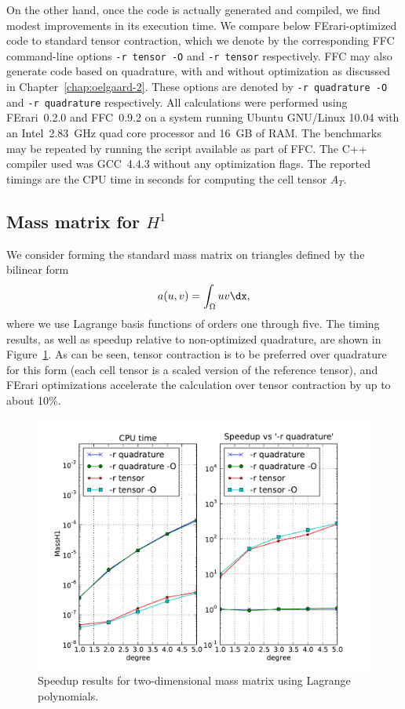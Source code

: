 On the other hand, once the code is actually generated and compiled,
we find modest improvements in its execution time. We compare below
FErari-optimized code to standard tensor contraction, which we denote
by the corresponding FFC command-line options \texttt{-r tensor -O}
and \texttt{-r tensor} respectively. FFC may also generate code based
on quadrature, with and without optimization as discussed in
Chapter~\ref{chap:oelgaard-2}. These options are denoted by \texttt{-r
  quadrature -O} and \texttt{-r quadrature} respectively. All
calculations were performed using FErari~0.2.0 and FFC~0.9.2 on a
system running Ubuntu GNU/Linux 10.04 with an Intel~2.83~GHz quad core
processor and 16~GB of RAM. The benchmarks may be repeated by running
the script  available as part of FFC. The C++
compiler used was GCC~4.4.3 without any optimization flags. The
reported timings are the CPU time in seconds for computing the cell
tensor $A_T$.

\subsection{Mass matrix for $H^1$}

We consider forming the standard mass matrix on triangles defined by
the bilinear form
\begin{equation} \label{eq:MassH1}
  a(u, v) = \int_{\Omega} u v \dx,
\end{equation}
where we use Lagrange basis functions of orders one through five. The
timing results, as well as speedup relative to non-optimized quadrature,
are shown in Figure~\ref{fig:MassH1}. As can be seen, tensor
contraction is to be preferred over quadrature for this form (each
cell tensor is a scaled version of the reference tensor), and FErari
optimizations accelerate the calculation over tensor contraction by up
to about 10\%.

\begin{figure}
\bwfig
  \centering
  \includegraphics[width=\largefig]{chapters/kirby-3/pdf/MassH1.pdf}
  \caption{Speedup results for two-dimensional mass matrix using Lagrange polynomials.}
  \label{fig:MassH1}
\end{figure}

